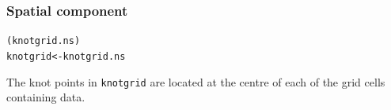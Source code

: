 \begin{frame}[fragile]
\frametitle{Spatial component}
\begin{knitrout}\footnotesize
{}\color{fgcolor}\begin{kframe}
\begin{alltt}
(knotgrid.ns)
knotgrid <- knotgrid.ns
\end{alltt}
\end{kframe}
\end{knitrout}

\noindent The knot points in {\tt knotgrid} are located at the centre of each of the grid cells containing data.
\end{frame}

